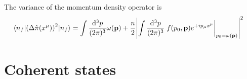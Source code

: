 \begin{corollary}
	The variance of the momentum density operator is
	\begin{equation}
		\begin{split}
			\expval{\left(\Delta\hat\pi(x^\mu)\right)^2}{n_f}
			&=
			\int\frac{\dd[3]{p}}{(2\pi)^3}
			\omega(\vb{p})
			+
			\frac{n}{2}
			\abs{
				\int\frac{\dd[3]{p}}{(2\pi)^3}
				\eval{
					f(p_0,\vb{p})
					e^{+ip_\mu x^\mu}
				}_{p_0=\omega(\vb{p})}
			}^2
		\end{split}
	\end{equation}
\end{corollary}

\section{Coherent states}

